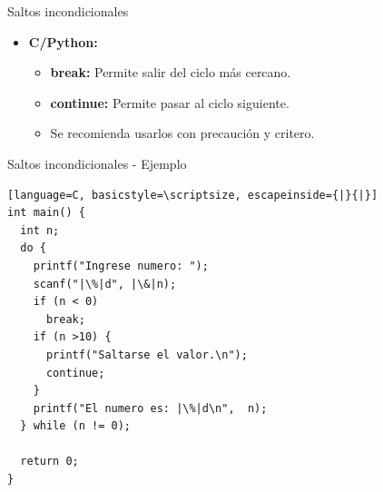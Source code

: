 \documentclass{beamer}
\begin{document}
\begin{frame}[fragile]{Saltos incondicionales}
\begin{itemize}
	\item \textbf{C/Python:}
	\begin{itemize}
		\item \textbf{break:} Permite salir del ciclo más cercano.
		\item \textbf{continue:} Permite pasar al ciclo siguiente.
		\item Se recomienda usarlos con precaución y critero.  
	\end{itemize}
\end{itemize}
\end{frame}

\begin{frame}[fragile]{Saltos incondicionales - Ejemplo}
\footnotesize
\begin{lstlisting}[language=C, basicstyle=\scriptsize, escapeinside={|}{|}] 
int main() {
  int n;
  do {
    printf("Ingrese numero: ");
    scanf("|\%|d", |\&|n);
    if (n < 0)
      break;
    if (n >10) {
      printf("Saltarse el valor.\n");
      continue;
    }
    printf("El numero es: |\%|d\n",  n);
  } while (n != 0);

  return 0;
}
\end{lstlisting}
\end{frame}

%	
%	
\end{document}

